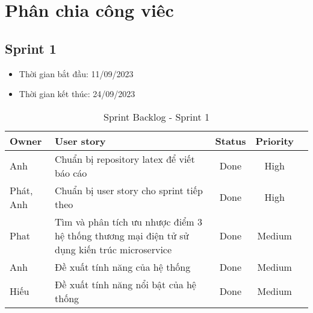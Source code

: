 \chapter{Phân chia công viêc}
\section{Sprint 1}
\begin{itemize}
    \item Thời gian bắt đầu: 11/09/2023
    \item Thời gian kết thúc: 24/09/2023
\end{itemize}
\begin{table}[H]
    \begin{tabular}{|m{2.5cm}|m{9cm}|c|c|c|}
    \hline
    \textbf{Owner}  & \textbf{User story}                                & \textbf{Status}  & \textbf{Priority} \\ \hline
    Anh                  & Chuẩn bị repository latex để viết báo cáo                                     & Done                              & High              \\ \hline
    Phát, Anh            & Chuẩn bị user story cho sprint tiếp theo                                             & Done                              & High              \\ \hline
    Phat                 & Tìm và phân tích ưu nhược điểm 3 hệ thống thương mại điện tử sử dụng kiến trúc microservice  & Done                              & Medium            \\ \hline
    Anh                  & Đề xuất tính năng của hệ thống                               & Done                              & Medium            \\ \hline
    Hiếu                 & Đề xuất tính năng nổi bật của hệ thống                         & Done                              & Medium            \\ \hline
    \end{tabular}
    \caption{Sprint Backlog - Sprint 1}
    \label{tab:sprint-1}
\end{table}
